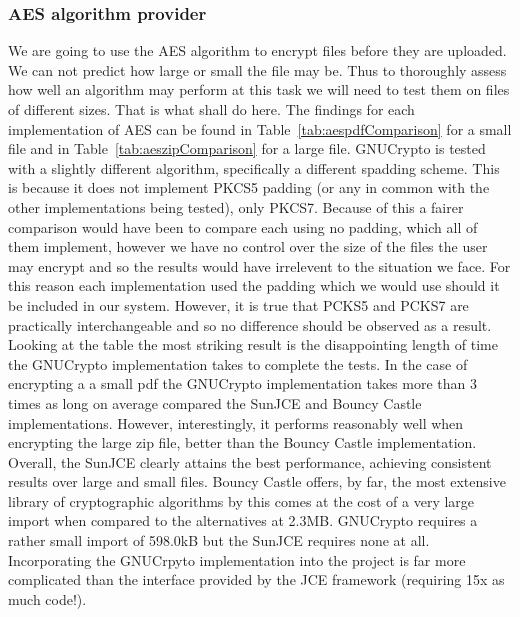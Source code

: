 \documentclass[12pt, titlepage]{article}
\begin{document}
\subsubsection{AES algorithm provider}
We are going to use the AES algorithm to encrypt files before they are uploaded. We can not predict how large or small the file may be. Thus to thoroughly assess how well an algorithm may perform at this task we will need to test them on files of different sizes. That is what shall do here.
\newline \indent The findings for each implementation of AES can be found in Table~\ref{tab:aespdfComparison} for a small file and in Table~\ref{tab:aeszipComparison} for a large file.
\newline \indent GNUCrypto is tested with a slightly different algorithm, specifically a different spadding scheme. This is because it does not implement PKCS5 padding (or any in common with the other implementations being tested), only PKCS7. Because of this a fairer comparison would have been to compare each using no padding, which all of them implement, however we have no control over the size of the files the user may encrypt and so the results would have irrelevent to the situation we face. For this reason each implementation used the padding which we would use should it be included in our system. However, it is true that PCKS5 and PCKS7 are practically interchangeable and so no difference should be observed as a result.
\newline Looking at the table the most striking result is the disappointing length of time the GNUCrypto implementation takes to complete the tests. In the case of encrypting a a small pdf the GNUCrypto implementation takes more than 3 times as long on average compared the SunJCE and Bouncy Castle implementations. However, interestingly, it performs reasonably well when encrypting the large zip file, better than the Bouncy Castle implementation. Overall, the SunJCE clearly attains the best performance, achieving consistent results over large and small files.
\newline \indent Bouncy Castle offers, by far, the most extensive library of cryptographic algorithms by this comes at the cost of a very large import when compared to the alternatives at 2.3MB. GNUCrypto requires a rather small import of 598.0kB but the SunJCE requires none at all.
\newline \indent Incorporating the GNUCrpyto implementation into the project is far more complicated than the interface provided by the JCE framework (requiring 15x as much code!).
\end{document}
